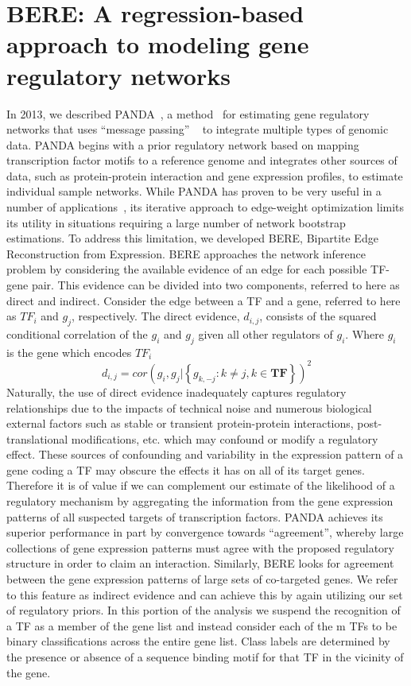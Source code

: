 \documentclass[english]{article}
\begin{document}
\section*{BERE: A regression-based approach to modeling gene regulatory networks }

In 2013, we described PANDA~\cite{glass2013passing}, a method~\cite{olsen2014inference}
for estimating gene regulatory networks that uses “message passing” ~\cite{frey2007clustering}
to integrate multiple types of genomic data. PANDA begins with a prior
regulatory network based on mapping transcription factor motifs to
a reference genome and integrates other sources of data, such as protein-protein
interaction and gene expression profiles, to estimate individual sample
networks. While PANDA has proven to be very useful in a number of
applications~\cite{lao2015genome,glass2015network,glass2014sexually},
its iterative approach to edge-weight optimization limits its utility
in situations requiring a large number of network bootstrap estimations.
To address this limitation, we developed BERE, Bipartite Edge Reconstruction
from Expression. BERE approaches the network inference problem by
considering the available evidence of an edge for each possible TF-gene
pair. This evidence can be divided into two components, referred to
here as direct and indirect. Consider the edge between a TF and a
gene, referred to here as $TF_{i}$ and $g_{j}$, respectively. The
direct evidence, $d_{i,j}$, consists of the squared conditional correlation
of the $g_{i}$ and $g_{j}$ given all other regulators of $g_{i}$.
Where $g_{i}$ is the gene which encodes $TF_{i}$ 
\[
d_{i,j}=cor\left(g_{i},g_{j}|\left\{ g_{k,-j}:k\ne j,k\in\mathbf{TF}\right\} \right)^{2}
\]
 Naturally, the use of direct evidence inadequately captures regulatory
relationships due to the impacts of technical noise and numerous biological
external factors such as stable or transient protein-protein interactions,
post-translational modifications, etc. which may confound or modify
a regulatory effect. These sources of confounding and variability
in the expression pattern of a gene coding a TF may obscure the effects
it has on all of its target genes. Therefore it is of value if we
can complement our estimate of the likelihood of a regulatory mechanism
by aggregating the information from the gene expression patterns of
all suspected targets of transcription factors. PANDA achieves its
superior performance in part by convergence towards “agreement”, whereby
large collections of gene expression patterns must agree with the
proposed regulatory structure in order to claim an interaction. Similarly,
BERE looks for agreement between the gene expression patterns of large
sets of co-targeted genes. We refer to this feature as indirect evidence
and can achieve this by again utilizing our set of regulatory priors.
In this portion of the analysis we suspend the recognition of a TF
as a member of the gene list and instead consider each of the m TFs
to be binary classifications across the entire gene list. Class labels
are determined by the presence or absence of a sequence binding motif
for that TF in the vicinity of the gene.
\end{document}
